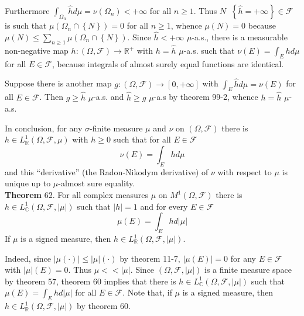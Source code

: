 \documentclass[a4paper]{article}
\newcommand{\obj}[1]{\left\{ #1 \right \}}
\newcommand{\clo}[1]{\left [ #1 \right ]}
\newcommand{\brac}[1]{\left ( #1 \right )}
\newcommand{\abs}[1]{\left | #1 \right |}
\newcommand{\Real}{\mathbb{R}}
\newcommand{\Zinf}{\clo{ 0, +\infty }}
\newcommand{\Cplx}{\mathbb{C}}
\newcommand{\Fcal}{\mathcal{F}}
\newcommand{\defn}{\mathop{\overset{\Delta}{=}}\nolimits}
\begin{document}
Furthermore $\int_{\Omega_n} \hat{h} d\mu = \nu\brac{\Omega_n} < +\infty$ for all $n\geq 1$. Thus $N\defn \obj{\hat{h}=+\infty}\in \Fcal$ is such that $\mu\brac{\Omega_n\cap \obj N}=0$ for all $n\geq 1$, whence $\mu\brac{N}=0$ because $\mu\brac{N}\leq \sum_{n\geq 1}\mu\brac{\Omega_n\cap \obj N}$. Since $\hat{h}<+\infty$ $\mu$-a.s., there is a measurable non-negative map $h:\brac{\Omega, \Fcal}\to \Real^+$ with $h=\hat{h}$ $\mu$-a.s. such that $\nu\brac{E} = \int_E h d\mu$ for all $E\in \Fcal$, because integrals of almost surely equal functions are identical.

Suppose there is another map $g:\brac{\Omega, \Fcal}\to\Zinf$ with $\int_E \hat{h} d\mu = \nu\brac{E}$ for all $E\in \Fcal$. Then $g\geq \hat{h}$ $\mu$-a.s. and $\hat{h}\geq g$ $\mu$-a.s by theorem 99-2, whence $h=\hat{h}$ $\mu$-a.s.

In conclusion, for any $\sigma$-finite measure $\mu$ and $\nu$ on $\brac{\Omega, \Fcal}$ there is $h\in L^1_\Real\brac{\Omega, \Fcal, \mu}$ with $h\geq 0$ such that for all $E\in \Fcal$ \[\nu\brac{E} = \int_E h d\mu\] and this ``derivative'' (the Radon-Nikodym derivative) of $\nu$ with respect to $\mu$ is unique up to $\mu$-almost sure equality.\\


\label{thm:cplx_meas_tot_var_int} \noindent \textbf{Theorem} 62.
For all complex measures $\mu$ on $M^1\brac{\Omega, \Fcal}$ there is $h\in L^1_\Cplx\brac{\Omega, \Fcal, \abs{\mu}}$ such that $\abs{h}=1$ and for every $E\in \Fcal$ \[\mu\brac{E} = \int_E h d\abs{\mu}\] If $\mu$ is a signed measure, then $h\in L^1_\Real\brac{\Omega, \Fcal, \abs{\mu}}$.

Indeed, since $\abs{\mu\brac{\cdot}}\leq \abs{\mu}\brac{\cdot}$ by theorem 11-7, $\abs{\mu\brac{E}}=0$ for any $E\in \Fcal$ with $\abs{\mu}\brac{E}=0$. Thus $\mu<<\abs{\mu}$. Since $\brac{\Omega, \Fcal, \abs{\mu}}$ is a finite measure space by theorem 57, theorem 60 implies that there is $h\in L^1_\Cplx\brac{\Omega, \Fcal, \abs{\mu}}$ such that $\mu\brac{E} = \int_E h d\abs{\mu}$ for all $E\in \Fcal$. Note that, if $\mu$ is a signed measure, then $h\in L^1_\Real\brac{\Omega, \Fcal, \abs{\mu}}$ by theorem 60.
\end{document}
